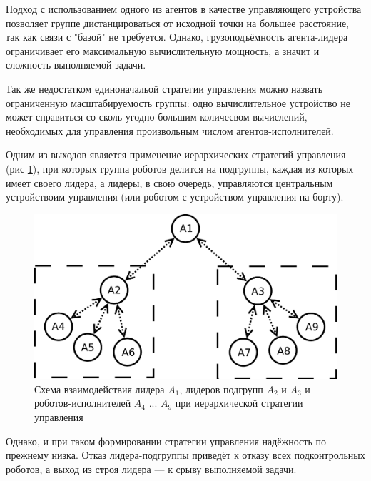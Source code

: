 \documentclass[a4paper, 14pt]{extarticle}
\begin{document}
Подход с использованием одного из агентов в качестве управляющего устройства позволяет группе дистанцироваться от исходной точки на большее расстояние, так как связи с "базой" не требуется. Однако, грузоподъёмность агента-лидера ограничивает его максимальную вычислительную мощность, а значит и сложность выполняемой задачи. \par
Так же недостатком единоначальой стратегии управления можно назвать ограниченную масштабируемость группы: одно вычислительное устройство не может справиться со сколь-угодно большим количесвом вычислений, необходимых для управления произвольным числом агентов-исполнителей. \par
Одним из выходов является применение иерархических стратегий управления (рис \ref{fig:centr-platoon}), при которых группа роботов делится на подгруппы, каждая из которых имеет своего лидера, а лидеры, в свою очередь, управляются центральным устройствоим управления (или роботом с устройством управления на борту). \par
\begin{figure}[!htbp]
	\centering
	\includegraphics[width=0.9\linewidth]{others/centr-platoon}
	\caption{Схема взаимодействия лидера $A_1$, лидеров подгрупп $A_2$ и $A_3$ и роботов-исполнителей $A_4$ ... $A_9$ при иерархической стратегии управления}
	\label{fig:centr-platoon}
\end{figure}
Однако, и при таком формировании стратегии управления надёжность по прежнему низка. Отказ лидера-подгруппы приведёт к отказу всех подконтрольных роботов, а выход из строя лидера — к срыву выполняемой задачи.
\end{document}
